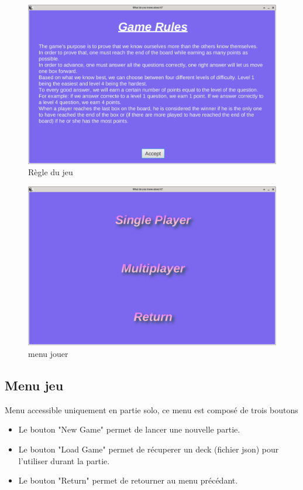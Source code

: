 \begin{figure}[h]
	\centering
	\includegraphics[width=\textwidth]{rule.png}
	\caption{Règle du jeu}
	\label{fig:regle_du_jeu}
\end{figure}

\begin{figure}[h]
	\centering
	\includegraphics[width=\textwidth]{menujouer.png}
	\caption{menu jouer}
	\label{fig:menu_jouer}
\end{figure}

\newpage
\subsection{Menu jeu}
Menu accessible uniquement en partie solo, ce menu est composé de trois boutons 
\begin{itemize}
	\item Le bouton "New Game" permet de lancer une nouvelle partie.
	\item Le bouton "Load Game" permet de récuperer un deck (fichier json) pour l'utiliser durant la partie.
	\item Le bouton "Return" permet de retourner au menu précédant.
\end{itemize}

